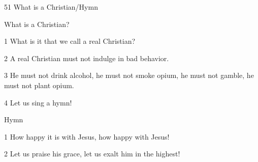 
51 What is a Christian/Hymn

What is a Christian?

1 What is it that we call a real Christian?

2 A real Christian must not indulge in bad behavior.

3 He must not drink alcohol, he must not smoke opium, he must not gamble, he must
not plant opium.

4 Let us sing a hymn!

Hymn

1 How happy it is with Jesus, how happy with Jesus!

2 Let us praise his grace, let us exalt him in the highest!


